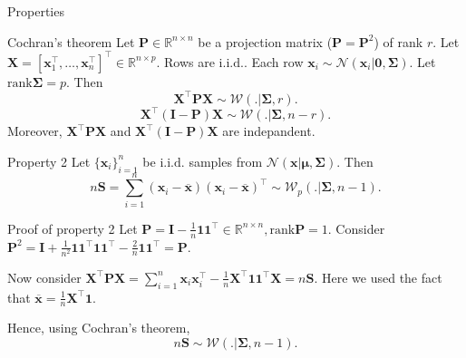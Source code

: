 \documentclass{beamer}
\begin{document}
\begin{frame}{Properties}
    \begin{block}{Cochran’s theorem}
        Let $\mathbf{P} \in \mathbb{R}^{n\times n}$ be a projection matrix
        ($\mathbf{P} = \mathbf{P}^2$) of rank $r$.
        Let $\mathbf{X} = [\mathbf{x}_1^\top, \ldots, \mathbf{x}_n^\top]^\top \in \mathbb{R}^{n\times p}$.
        Rows are $\mathrm{i.i.d.}$.
        Each row $\mathbf{x}_i \sim \mathcal{N}(\mathbf{x}_i|\mathbf{0}, \mathbf{\Sigma})$.
        Let $\mathrm{rank}\mathbf{\Sigma} = p$. Then
        \[
            \mathbf{X}^\top\mathbf{P}\mathbf{X} \sim \mathcal{W}(.|\mathbf{\Sigma}, r).
        \]
        \[
            \mathbf{X}^\top(\mathbf{I} - \mathbf{P})\mathbf{X} \sim \mathcal{W}(.|\mathbf{\Sigma}, n-r).
        \]
        Moreover, $\mathbf{X}^\top\mathbf{P}\mathbf{X}$ and $\mathbf{X}^\top(\mathbf{I} - \mathbf{P})\mathbf{X}$ are
        indepandent.
    \end{block}

    \begin{block}{Property 2}
    Let $\{\mathbf{x}_i\}_{i=1}^n$ be $\mathrm{i.i.d.}$ samples from
    $\mathcal{N}(\mathbf{x}|\boldsymbol\mu, \mathbf{\Sigma})$. Then
    \[
        n\mathbf{S} = \sum_{i=1}^n(\mathbf{x}_i - \overline{\mathbf{x}})(\mathbf{x}_i - \overline{\mathbf{x}})^\top
        \sim \mathcal{W}_p(.|\mathbf{\Sigma}, n - 1).
    \]
    \end{block}
\end{frame}


\begin{frame}{Proof of property 2}
    Let $\mathbf{P} = \mathbf{I} - \frac{1}{n}\mathbf{1}\mathbf{1}^\top \in \mathbb{R}^{n\times n}, \mathrm{rank}\mathbf{P} = 1$.
    Consider $\mathbf{P}^2 = \mathbf{I} + \frac{1}{n^2}\mathbf{1}\mathbf{1}^\top\mathbf{1}\mathbf{1}^\top
    - \frac{2}{n}\mathbf{1}\mathbf{1}^\top = \mathbf{P}$.
    
    Now consider $\mathbf{X}^\top\mathbf{P}\mathbf{X} = \sum_{i=1}^n\mathbf{x}_i\mathbf{x}_i^\top -\frac{1}{n}\mathbf{X}^\top\mathbf{1}\mathbf{1}^\top\mathbf{X} = n\mathbf{S}$.
    Here we used the fact that $\overline{\mathbf{x}} = \frac{1}{n}\mathbf{X}^\top\mathbf{1}$.

    Hence, using Cochran's theorem,
    \[
        n\mathbf{S} \sim \mathcal{W}(.|\mathbf{\Sigma}, n - 1).
    \]
\end{frame}
\end{document}
